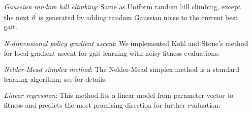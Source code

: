 \emph{Gaussian random hill climbing}: Same as Uniform random hill climbing, except the next
  $\vec{\theta}$ is generated by adding random Gaussian noise to the
  current best gait.

\emph{N-dimensional policy gradient ascent}: We implemented Kohl
  and Stone's \cite{kohl} method for local gradient ascent for gait
  learning with noisy fitness evaluations.


\emph{Nelder-Mead simplex method}: The Nelder-Mead simplex
  method is a standard learning algorithm; see \cite{nm} for details.

\emph{Linear regression}: This method fits a linear model from
parameter vector to fitness and predicts the most promising direction
for further evaluation.



